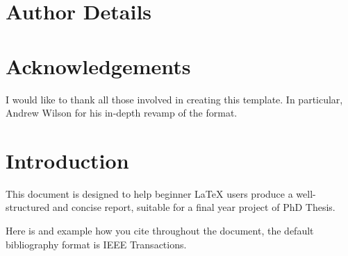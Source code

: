 \documentclass[11pt,a4paper,normalphoto,withhyper]{altareport}
\begin{document}
\MakeReportTitlePage

\setcounter{page}{1}

\section*{Author Details}



\makeauthordetails
{}
\makeauthordetails
\setcounter{tocdepth}{2} 
\tableofcontents %
\listoffigures %
\listoftables %
\newpage
\section*{Acknowledgements}
I would like to thank all those involved in creating this template. In particular, Andrew Wilson for his in-depth revamp of the format.

\newpage



\section{Introduction}
This document is designed to help beginner LaTeX users produce a well-structured and concise report, suitable for a final year project of PhD Thesis. 

Here is and example how you cite throughout the document\cite{JenningsWilson2021}, the default bibliography format is IEEE Transactions.
\newpage
\end{document}
